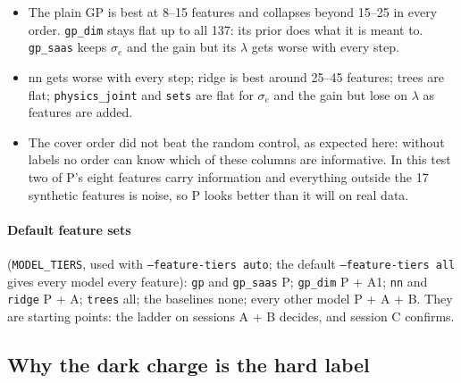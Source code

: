 \documentclass[10pt]{article}
\newcommand{\code}[1]{\texttt{#1}}
\begin{document}
\begin{itemize}
\item The plain GP is best at 8--15 features and collapses beyond 15--25 in every order. \code{gp\_dim} stays flat up to all 137: its
  prior does what it is meant to. \code{gp\_saas} keeps $\sigma_e$ and the gain but its $\lambda$ gets worse with every step.
\item nn gets worse with every step; ridge is best around 25--45 features; trees are flat; \code{physics\_joint} and \code{sets} are flat
  for $\sigma_e$ and the gain but lose on $\lambda$ as features are added.
\item The cover order did not beat the random control, as expected here: without labels no order can know which of these columns are
  informative. In this test two of P's eight features carry information and everything outside the 17 synthetic features is noise, so P
  looks better than it will on real data.
\end{itemize}

\paragraph{Default feature sets} (\code{MODEL\_TIERS}, used with \code{--feature-tiers auto}; the default \code{--feature-tiers all}
gives every model every feature): \code{gp} and \code{gp\_saas} P; \code{gp\_dim} P + A1; \code{nn} and \code{ridge} P + A; \code{trees}
all; the baselines none; every other model P + A + B. They are starting points: the ladder on sessions A + B decides, and session C
confirms.

\subsection{Why the dark charge is the hard label}
\label{sec:lvl1lambda}
\end{document}
